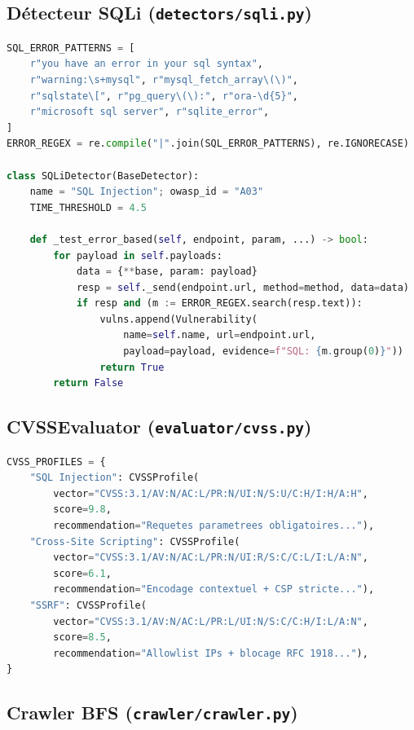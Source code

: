 \documentclass[12pt,a4paper]{report}
\begin{document}
\subsection{Détecteur SQLi (\texttt{detectors/sqli.py})}

\begin{lstlisting}[language=python, caption={Détecteur SQLi — error-based et time-based}]
SQL_ERROR_PATTERNS = [
    r"you have an error in your sql syntax",
    r"warning:\s+mysql", r"mysql_fetch_array\(\)",
    r"sqlstate\[", r"pg_query\(\):", r"ora-\d{5}",
    r"microsoft sql server", r"sqlite_error",
]
ERROR_REGEX = re.compile("|".join(SQL_ERROR_PATTERNS), re.IGNORECASE)

class SQLiDetector(BaseDetector):
    name = "SQL Injection"; owasp_id = "A03"
    TIME_THRESHOLD = 4.5

    def _test_error_based(self, endpoint, param, ...) -> bool:
        for payload in self.payloads:
            data = {**base, param: payload}
            resp = self._send(endpoint.url, method=method, data=data)
            if resp and (m := ERROR_REGEX.search(resp.text)):
                vulns.append(Vulnerability(
                    name=self.name, url=endpoint.url,
                    payload=payload, evidence=f"SQL: {m.group(0)}"))
                return True
        return False
\end{lstlisting}

\subsection{CVSSEvaluator (\texttt{evaluator/cvss.py})}

\begin{lstlisting}[language=python, caption={CVSSEvaluator avec profils CVSS}]
CVSS_PROFILES = {
    "SQL Injection": CVSSProfile(
        vector="CVSS:3.1/AV:N/AC:L/PR:N/UI:N/S:U/C:H/I:H/A:H",
        score=9.8,
        recommendation="Requetes parametrees obligatoires..."),
    "Cross-Site Scripting": CVSSProfile(
        vector="CVSS:3.1/AV:N/AC:L/PR:N/UI:R/S:C/C:L/I:L/A:N",
        score=6.1,
        recommendation="Encodage contextuel + CSP stricte..."),
    "SSRF": CVSSProfile(
        vector="CVSS:3.1/AV:N/AC:L/PR:L/UI:N/S:C/C:H/I:L/A:N",
        score=8.5,
        recommendation="Allowlist IPs + blocage RFC 1918..."),
}
\end{lstlisting}

\subsection{Crawler BFS (\texttt{crawler/crawler.py})}
\end{document}
